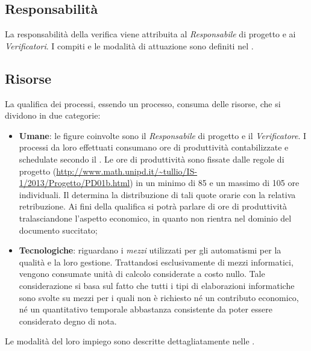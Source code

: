 	\subsection{Responsabilità}

	La responsabilità della verifica viene attribuita al \emph{Responsabile} di progetto e ai \emph{Verificatori}. I compiti e le modalità di attuazione sono definiti nel \PianoDiProgetto.
	
	\subsection{Risorse}

	La qualifica dei processi, essendo un processo, consuma delle risorse, che si dividono in due categorie:
		\begin{itemize}
  			\item \textbf{Umane}: le figure coinvolte sono il \emph{Responsabile} di progetto e il \emph{Verificatore}. I processi da loro effettuati consumano ore di produttività contabilizzate e schedulate secondo il \PianoDiProgetto{}. Le ore di produttività sono fissate dalle regole di progetto (\url{http://www.math.unipd.it/~tullio/IS-1/2013/Progetto/PD01b.html}) in un minimo di 85 e un massimo di 105 ore individuali. Il \PianoDiProgetto{} determina la distribuzione di tali quote orarie con la relativa retribuzione. Ai fini della qualifica si potrà parlare di ore di produttività tralasciandone l'aspetto economico, in quanto non rientra nel dominio del documento succitato; 
  			
  			\item \textbf{Tecnologiche}: riguardano i \emph{mezzi} utilizzati per gli automatismi per la qualità e la loro gestione. Trattandosi esclusivamente di mezzi informatici, vengono consumate unità di calcolo considerate a costo nullo. Tale considerazione si basa sul fatto che tutti i tipi di elaborazioni informatiche sono svolte su mezzi per i quali non è richiesto né un contributo economico, né un quantitativo temporale abbastanza consistente da poter essere considerato degno di nota.
		\end{itemize}
		
	Le modalità del loro impiego sono descritte dettagliatamente nelle \NormeDiProgetto{}.
	
		
